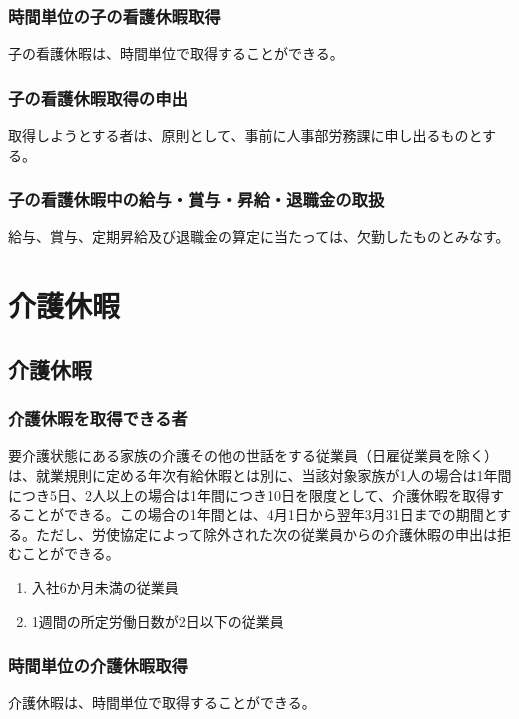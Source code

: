 \documentclass{jsarticle}
\begin{document}
\subsubsection{時間単位の子の看護休暇取得}
\label{育介_項_時間単位の子の看護休暇取得}
子の看護休暇は、時間単位で取得することができる。

\subsubsection{子の看護休暇取得の申出}
\label{育介_項_子の看護休暇取得の申出}
取得しようとする者は、原則として、事前に人事部労務課に申し出るものとする。 

\subsubsection{子の看護休暇中の給与・賞与・昇給・退職金の取扱}
\label{育介_項_子の看護休暇中の給与・賞与・昇給・退職金の取扱}
給与、賞与、定期昇給及び退職金の算定に当たっては、欠勤したものとみなす。

\section{介護休暇}

\subsection{介護休暇}
\label{育介_条_介護休暇}

\subsubsection{介護休暇を取得できる者}
\label{育介_項_介護休暇を取得できる者}
要介護状態にある家族の介護その他の世話をする従業員（日雇従業員を除く）は、就業規則に定める年次有給休暇とは別に、当該対象家族が1人の場合は1年間につき5日、2人以上の場合は1年間につき10日を限度として、介護休暇を取得することができる。この場合の1年間とは、4月1日から翌年3月31日までの期間とする。ただし、労使協定によって除外された次の従業員からの介護休暇の申出は拒むことができる。
\begin{enumerate}
  \item 入社6か月未満の従業員
  \item 1週間の所定労働日数が2日以下の従業員 
\end{enumerate}

\subsubsection{時間単位の介護休暇取得}
\label{育介_項_時間単位の介護休暇取得}
介護休暇は、時間単位で取得することができる。
\end{document}
